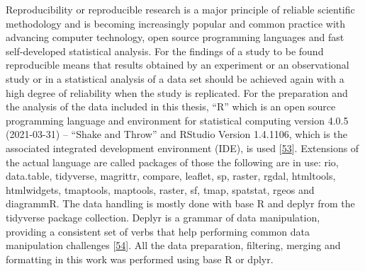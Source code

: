 \documentclass[a4paper,11pt]{article}
\begin{document}
Reproducibility or reproducible research is a major principle of reliable scientific methodology and is becoming increasingly popular and common practice with advancing computer technology, open source programming languages and fast self-developed statistical analysis. For the findings of a study to be found reproducible means that results obtained by an experiment or an observational study or in a statistical analysis of a data set should be achieved again with a high degree of reliability when the study is replicated. For the preparation and the analysis of the data included in this thesis, ``R'' which is an open source programming language and environment for statistical computing version 4.0.5 (2021-03-31) -- ``Shake and Throw'' and RStudio Version 1.4.1106, which is the associated integrated development environment (IDE), is used {[}\protect\hyperlink{ref-R}{53}{]}. Extensions of the actual language are called packages of those the following are in use: rio, data.table, tidyverse, magrittr, compare, leaflet, sp, raster, rgdal, htmltools, htmlwidgets, tmaptools, maptools, raster, sf, tmap, spatstat, rgeos and diagrammR. The data handling is mostly done with base R and deplyr from the tidyverse package collection. Deplyr is a grammar of data manipulation, providing a consistent set of verbs that help performing common data manipulation challenges {[}\protect\hyperlink{ref-HadleyWickham.2021}{54}{]}. All the data preparation, filtering, merging and formatting in this work was performed using base R or dplyr.
\end{document}
